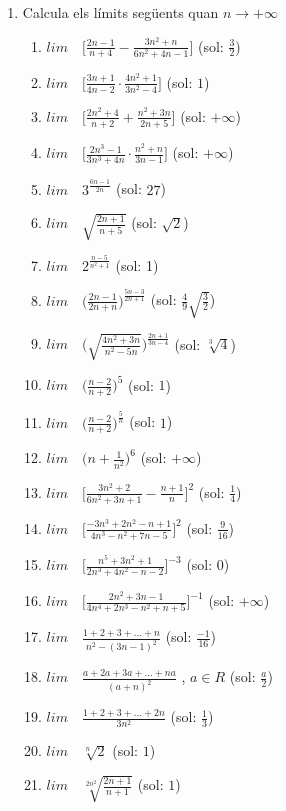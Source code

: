 \documentclass{article}
\begin{document}
	\author{Mireia Dosil}
	\date{text}



\begin{enumerate}
 
\item Calcula els límits següents quan $n\rightarrow +\infty$


\begin{enumerate}
	\item $lim \quad \Big[ \frac{2n-1}{n+4}-\frac{3n^2+n}{6n^2+4n-1} \Big]$ (sol: $\frac{3}{2}$)
	\item $lim \quad \Big[ \frac{3n+1}{4n-2}\cdot \frac{4n^2+1}{3n^2-4} \Big]$ (sol: $1$)
	\item $lim \quad \Big[ \frac{2n^2+4}{n+2}+\frac{n^2+3n}{2n+5} \Big]$ (sol: $+\infty$)
	\item $lim \quad \Big[ \frac{2n^3-1}{3n^3+4n}\cdot \frac{n^2+n}{3n-1} \Big]$ (sol: $+\infty$)
	\item $lim \quad 3^{\frac{6n-1}{2n}}$ (sol: $27$)
	\item $lim \quad \sqrt{\frac{2n+1}{n+5}}$ (sol: $\sqrt{2}$)
	\item $lim \quad 2^{\frac{n-5}{n^2+1}}$ (sol: 1)
	\item $lim \quad \Big(\frac{2n-1}{2n+n}\Big)^{\frac{5n-3}{2n+1}}$ (sol: $\frac{4}{9}\sqrt{\frac{3}{2}}$)
	\item $lim \quad \Big(\sqrt{\frac{4n^2+3n}{n^2-5n}} \Big)^{\frac{2n+1}{3n-4}}$ (sol: $\sqrt[3]{4}$)
	\item $lim \quad \Big(\frac{n-2}{n+2}\Big)^5$ (sol: $1$)
	\item $lim \quad \Big(\frac{n-2}{n+2}\Big)^{\frac{5}{n}}$ (sol: $1$)
	\item $lim \quad \Big(n+\frac{1}{n^2}\Big)^6$ (sol: $+\infty$)
	\item $lim \quad \Big[ \frac{3n^2+2}{6n^2+3n+1}-\frac{n+1}{n} \Big]^2$ (sol: $\frac{1}{4}$)
	\item $lim \quad \Big[ \frac{-3n^3+2n^2-n+1}{4n^3-n^2+7n-5}\Big]^2$ (sol: $\frac{9}{16}$)
	\item $lim \quad \Big[ \frac{n^5+3n^2+1}{2n^3+4n^2-n-2}\Big]^{-3}$ (sol: $0$)
	\item $lim \quad \Big[ \frac{2n^2+3n-1}{4n^4+2n^3-n^2+n+5}\Big]^{-1}$ (sol: $+\infty$)
	\item $lim \quad \frac{1+2+3+...+n}{n^2-(3n-1)^2}$ (sol: $\frac{-1}{16}$)
	\item $lim \quad \frac{a+2a+3a+...+na}{(a+n)^2}$ ,  $a \in R$ (sol: $\frac{a}{2}$)
	\item $lim \quad \frac{1+2+3+...+2n}{3n^2}$ (sol: $\frac{1}{3}$)
	\item $lim \quad \sqrt[n]{2}$ (sol: $1$)
	\item $lim \quad \sqrt[2n^2]{\frac{2n+1}{n+1}}$ (sol: $1$)
\end{enumerate}


\end{enumerate}
\end{document}
